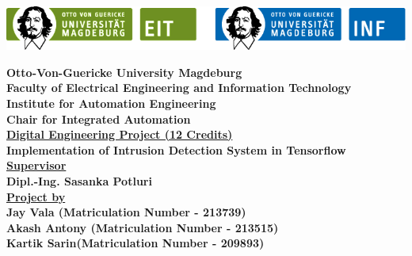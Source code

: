 \documentclass[12pt, a4paper]{report}
\begin{document}
\begin{titlepage}
	\begin{flushleft}
	\includegraphics[width=14cm]{combine.png}\\
	\end{flushleft}
	\begin{center}
	
	
	\LARGE\bfseries{Otto-Von-Guericke University Magdeburg}\\
	[0.5in ]
	\large {Faculty of Electrical Engineering and Information Technology}\\
	[0.5in]
	\large {Institute for Automation Engineering}\\
	[0.5in]
	\large{Chair for Integrated Automation}\\
	[0.5in]
	\normalsize{\underline {Digital Engineering Project (12 Credits)}}\\
	[0.3in]
	\Huge\bfseries {Implementation of Intrusion Detection System in Tensorflow}\\
	[1in]
	\normalsize {\underline {Supervisor}}\\
	[0.2in]
	Dipl.-Ing. Sasanka Potluri\\
	[0.6in]
	\normalsize {\underline{Project by}}\\
	[0.2in]
	Jay Vala (Matriculation Number - 213739)\\
	Akash Antony (Matriculation Number - 213515)\\
	Kartik Sarin(Matriculation Number - 209893)\\
	\end{center}
	
\end{titlepage}

\tableofcontents 
\thispagestyle{empty}
\thispagestyle{empty}
\listoffigures
\thispagestyle{empty}
\listoftables
\thispagestyle{empty}
\end{document}
